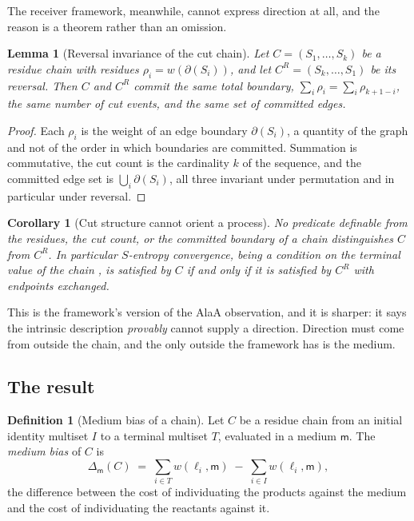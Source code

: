 \documentclass[11pt,twocolumn,a4paper]{article}
\theoremstyle{thmstyle}
\newtheorem{lemma}[theorem]{Lemma}
\newtheorem{corollary}[theorem]{Corollary}
\theoremstyle{definition}
\newtheorem{definition}[theorem]{Definition}
\theoremstyle{remark}
\newcommand{\res}{\rho}
\newcommand{\cut}{\partial}
\newcommand{\med}{\mathsf{m}}
\begin{document}
The receiver framework, meanwhile, cannot express direction at all, and
the reason is a theorem rather than an omission.

\begin{lemma}[Reversal invariance of the cut chain]
\label{lem:reversal}
Let $C=(S_1,\dots,S_k)$ be a residue chain with residues
$\res_i=w(\cut(S_i))$, and let $C^{R}=(S_k,\dots,S_1)$ be its reversal.
Then $C$ and $C^{R}$ commit the same total boundary,
$\sum_i \res_i = \sum_i \res_{k+1-i}$, the same number of cut events, and
the same set of committed edges.
\end{lemma}

\begin{proof}
Each $\res_i$ is the weight of an edge boundary $\cut(S_i)$, a quantity of
the graph and not of the order in which boundaries are committed.
Summation is commutative, the cut count is the cardinality $k$ of the
sequence, and the committed edge set is $\bigcup_i \cut(S_i)$, all three
invariant under permutation and in particular under reversal.
\end{proof}

\begin{corollary}[Cut structure cannot orient a process]
\label{cor:no-orientation}
No predicate definable from the residues, the cut count, or the committed
boundary of a chain distinguishes $C$ from $C^{R}$. In particular
$S$-entropy convergence, being a condition on the terminal value of the
chain \citep{sachikonye2025causal}, is satisfied by $C$ if and only if it
is satisfied by $C^{R}$ with endpoints exchanged.
\end{corollary}

This is the framework's version of the AlaA observation, and it is
sharper: it says the intrinsic description \emph{provably} cannot supply a
direction. Direction must come from outside the chain, and the only
outside the framework has is the medium.

\subsection{The result}

\begin{definition}[Medium bias of a chain]
\label{def:bias}
Let $C$ be a residue chain from an initial identity multiset $I$ to a
terminal multiset $T$, evaluated in a medium $\med$. The \emph{medium
bias} of $C$ is
\begin{equation}
\Delta_{\med}(C)
 \;=\; \sum_{i\in T} w(\ell_i,\med) \;-\; \sum_{i\in I} w(\ell_i,\med),
\label{eq:bias}
\end{equation}
the difference between the cost of individuating the products against the
medium and the cost of individuating the reactants against it.
\end{definition}
\end{document}
